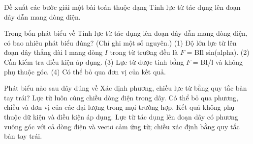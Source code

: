 \begin{bt}
Đề xuất các bước giải một bài toán thuộc dạng Tính lực từ tác dụng lên đoạn dây dẫn mang dòng điện.
\end{bt}

\begin{ex}
Trong bốn phát biểu về Tính lực từ tác dụng lên đoạn dây dẫn mang dòng điện, có bao nhiêu phát biểu đúng? (Chỉ ghi một số nguyên.) (1) Độ lớn lực từ lên đoạn dây thẳng dài l mang dòng $I$ trong từ trường đều là $F$ = BIl sin(alpha). (2) Cần kiểm tra điều kiện áp dụng. (3) Lực từ được tính bằng $F$ = BI/l và không phụ thuộc góc. (4) Có thể bỏ qua đơn vị của kết quả.
\end{ex}

\begin{ex}
Phát biểu nào sau đây đúng về Xác định phương, chiều lực từ bằng quy tắc bàn tay trái?
\choice
{Lực từ luôn cùng chiều dòng điện trong dây.}
{Có thể bỏ qua phương, chiều và đơn vị của các đại lượng trong mọi trường hợp.}
{Kết quả không phụ thuộc dữ kiện và điều kiện áp dụng.}
{\True Lực từ tác dụng lên đoạn dây có phương vuông góc với cả dòng điện và vectơ cảm ứng từ; chiều xác định bằng quy tắc bàn tay trái.}
\end{ex}

